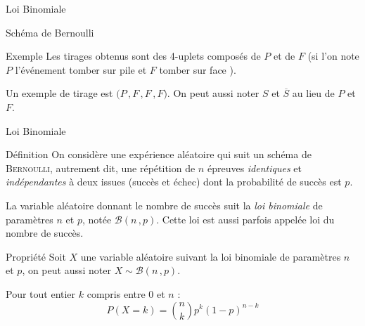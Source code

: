 \documentclass{coursbook}
\begin{document}
\begin{Gpartie}{Loi Binomiale}
\begin{Spartie}{Schéma de Bernoulli}
\begin{SSpartie}{Exemple}
                Les tirages obtenus sont des 4-uplets composés de $P$ et de $F$ (si l'on note $P$ l'événement \og tomber sur pile \fg{} et $F$ \og tomber sur face \fg{}).
                
                Un exemple de tirage est $\big(P\,, F\,, F\,, F\big)$. On peut aussi noter $S$ et $\overline{S}$ au lieu de $P$ et $F$.
            \end{SSpartie}
        \end{Spartie}
        \begin{Spartie}{Loi Binomiale} 
            \begin{SSpartie}{Définition} 
                On considère une expérience aléatoire qui suit un schéma de \textsc{Bernoulli}, autrement dit, une répétition de $n$ épreuves \emph{identiques} et \emph{indépendantes} à deux issues (succès et échec) dont la probabilité de succès est $p$.

                La variable aléatoire donnant le nombre de succès suit la \emph{loi binomiale} de paramètres $n$ et $p$, notée $\mathcal{B}(n\,, p)$. Cette loi est aussi parfois appelée loi du nombre de succès.
            \end{SSpartie}
            \begin{SSpartie}{Propriété} 
                Soit $X$ une variable aléatoire suivant la loi binomiale de paramètres $n$ et $p$, on peut aussi noter $X\sim\mathcal{B}(n\,, p)$.

                Pour tout entier $k$ compris entre $0$ et $n$ :
                \[\boxed{P(X=k)=\binom{n}{k}p^k(1-p)^{n-k}}\]


\end{SSpartie}
\end{Spartie}
\end{Gpartie}
\end{document}
